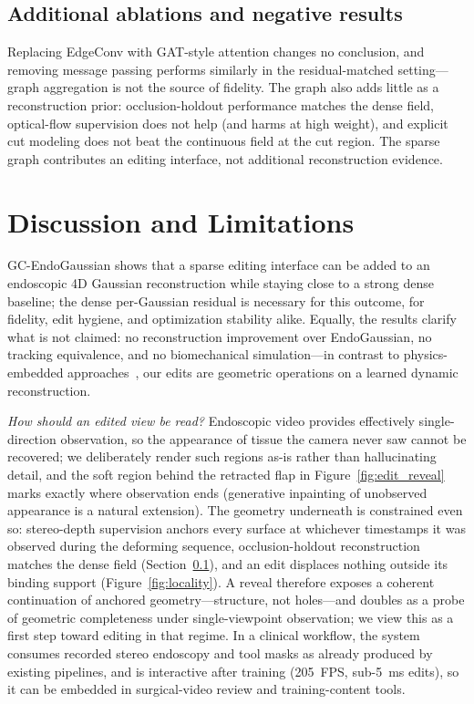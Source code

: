 \documentclass[ASNA,twocolumn]{USG} %
\begin{document}
\subsection{Additional ablations and negative results}\label{sec:ablations}

Replacing EdgeConv with GAT-style attention \cite{velivckovic2018graph} changes no conclusion, and removing message passing performs similarly in the residual-matched setting---graph aggregation is not the source of fidelity. The graph also adds little as a reconstruction prior: occlusion-holdout performance matches the dense field, optical-flow supervision does not help (and harms at high weight), and explicit cut modeling does not beat the continuous field at the cut region. The sparse graph contributes an editing interface, not additional reconstruction evidence.

\section{Discussion and Limitations}\label{sec6}

GC-EndoGaussian shows that a sparse editing interface can be added to an endoscopic 4D Gaussian reconstruction while staying close to a strong dense baseline; the dense per-Gaussian residual is necessary for this outcome, for fidelity, edit hygiene, and optimization stability alike. Equally, the results clarify what is not claimed: no reconstruction improvement over EndoGaussian, no tracking equivalence, and no biomechanical simulation---in contrast to physics-embedded approaches~\cite{yang2024simendogs,yang2025sparsesim}, our edits are geometric operations on a learned dynamic reconstruction.

\emph{How should an edited view be read?} Endoscopic video provides effectively single-direction observation, so the appearance of tissue the camera never saw cannot be recovered; we deliberately render such regions as-is rather than hallucinating detail, and the soft region behind the retracted flap in Figure~\ref{fig:edit_reveal} marks exactly where observation ends (generative inpainting of unobserved appearance is a natural extension). The geometry underneath is constrained even so: stereo-depth supervision anchors every surface at whichever timestamps it was observed during the deforming sequence, occlusion-holdout reconstruction matches the dense field (Section~\ref{sec:ablations}), and an edit displaces nothing outside its binding support (Figure~\ref{fig:locality}). A reveal therefore exposes a coherent continuation of anchored geometry---structure, not holes---and doubles as a probe of geometric completeness under single-viewpoint observation; we view this as a first step toward editing in that regime. In a clinical workflow, the system consumes recorded stereo endoscopy and tool masks as already produced by existing pipelines, and is interactive after training (205~FPS, sub-5~ms edits), so it can be embedded in surgical-video review and training-content tools.
\end{document}
